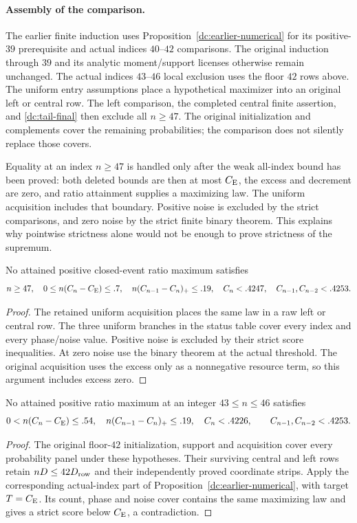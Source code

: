\paragraph{Assembly of the comparison.}
\label{j:local:comparison}
The earlier finite induction uses Proposition~\ref{dc:earlier-numerical} for its positive-$39$ prerequisite
and actual indices $40$--$42$ comparisons. The original induction through $39$ and its
analytic moment/support licenses otherwise remain unchanged.
The actual indices $43$--$46$ local exclusion uses the floor $42$ rows above.
The uniform entry assumptions place a hypothetical maximizer into an
original left or central row. The left comparison, the completed central
finite assertion, and \eqref{dc:tail-final} then exclude all $n\ge47$.
The original initialization and complements cover the remaining
probabilities; the comparison does not silently replace those covers.

Equality at an
index $n\ge47$ is handled only after the weak all-index bound has been
proved: both deleted bounds are then at most $C_{\mathrm E}$, the excess and
decrement are zero, and ratio attainment supplies a maximizing law.
The uniform acquisition includes that boundary. Positive noise is excluded
by the strict comparisons, and zero noise by the strict finite binary
theorem. This explains why pointwise strictness alone would not be enough
to prove strictness of the supremum.

\begin{proposition}
\label{j:local:uniform}
No attained positive closed-event ratio maximum
satisfies
\[
 n\ge47,\quad 0\le n(C_n-C_{\mathrm E})\le.7,\quad
 n(C_{n-1}-C_n)_+\le.19,\quad C_n<.4247,
 \quad C_{n-1},C_{n-2}<.4253.
\]
\end{proposition}
\begin{proof}
The retained uniform acquisition places the same law in a raw left or
central row. The three uniform branches in the status table cover every
index and every phase/noise value. Positive noise is excluded by their
strict score inequalities. At zero noise use the binary theorem at the
actual threshold. The original acquisition uses the excess only as a
nonnegative resource term, so this argument includes excess zero.
\end{proof}

\begin{proposition}
\label{j:local:finite4346}
No attained positive ratio maximum at an integer $43\le n\le46$ satisfies
\[
 0<n(C_n-C_{\mathrm E})\le.54,\quad n(C_{n-1}-C_n)_+\le.19,\quad
 C_n<.4226,\qquad C_{n-1},C_{n-2}<.4253.
\]
\end{proposition}
\begin{proof}
The original floor-$42$ initialization, support and acquisition cover
every probability panel under these hypotheses. Their surviving central
and left rows retain $nD\le42D_{\rm row}$ and their independently proved
coordinate strips. Apply the corresponding actual-index part of
Proposition~\ref{dc:earlier-numerical}, with target $T=C_{\mathrm E}$.
Its count, phase and noise cover contains the same maximizing law and
gives a strict score below $C_{\mathrm E}$, a contradiction.
\end{proof}

